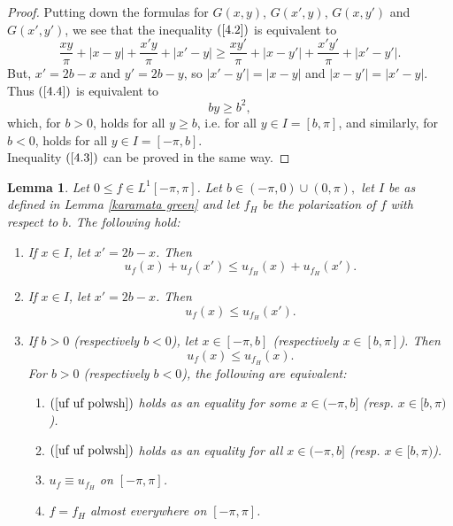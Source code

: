 \documentclass[11pt]{amsart}
\newtheorem{lemma}[theorem]{Lemma}
\numberwithin{equation}{section}
\begin{document}
\begin{proof}
Putting down the formulas for \(G(x,y)\), \(G(x',y)\), \(G(x,y')\) and \(G(x',y')\), we see that the inequality \((\ref{4.2})\) is equivalent to 
\begin{equation}\label{4.4}
\frac{xy}{\pi}+|x-y|+\frac{x'y}{\pi}+|x'-y|\geq\frac{xy'}{\pi}+|x-y'|+\frac{x'y'}{\pi}+|x'-y'|.
\end{equation}
But, \(x'=2b-x\) and \(y'=2b-y\), so \(|x'-y'|=|x-y|\) and \(|x-y'|=|x'-y|\). Thus \((\ref{4.4})\) is equivalent to 
\begin{equation}\label{4.5}
    by\geq b^2,
\end{equation}
which, for \(b>0\), holds for all \(y\geq b\), i.e. for all \(y\in I=[b,\pi]\), and similarly, for  \(b<0\), holds for all \(y\in I=[-\pi,b]\).\\
Inequality \((\ref{4.3})\) can be proved in the same way.
\end{proof}
\begin{lemma}\label{lemma karamata u f}
Let \(0\leq f\in L^1[-\pi,\pi]\). Let \(b\in(-\pi,0)\cup(0,\pi),\) let \(I\) be as defined in Lemma \textnormal{\ref{karamata green}} and let \(f_H\) be the polarization of \(f\) with respect to \(b\). The following hold:
\begin{enumerate}
    \item[(a)] If \(x\in I\), let \(x'=2b-x\). Then
    \begin{equation}\label{uf syn uf}
    u_f(x)+u_f(x')\leq u_{f_H}(x)+u_{f_H}(x').
    \end{equation}
    \item[(b)] If \(x\in I\), let \(x'=2b-x\). Then
    \begin{equation}\label{uf uf polwsh polwsh}
    u_f(x)\leq u_{f_H}(x').
    \end{equation}
    \item[(c)] If \(b>0\) (respectively \(b<0\)), let \(x\in[-\pi,b]\) (respectively \(x\in [b,\pi]\)). Then 
    \begin{equation}\label{uf uf polwsh}
    u_f(x)\leq u_{f_H}(x).
    \end{equation}
    For \(b>0\) (respectively \(b<0\)), the following are equivalent:
    \begin{enumerate}
        \item[(i)] \((\ref{uf uf polwsh})\) holds as an equality for some \(x\in(-\pi,b]\) (resp. \(x\in [b,\pi)\)).
        \item[(ii)] \((\ref{uf uf polwsh})\) holds as an equality for all \(x\in(-\pi,b]\) (resp. \(x\in [b,\pi)\)).
        \item[(iii)] \(u_f\equiv u_{f_H}\) on \([-\pi,\pi]\).
        \item[(iv)] \(f=f_H\) almost everywhere on \([-\pi,\pi]\).
    \end{enumerate}
\end{enumerate}
\end{lemma}
\end{document}
